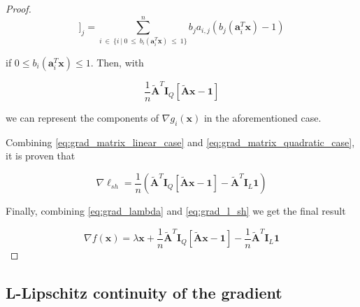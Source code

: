 \documentclass[12pt]{article}
\newcommand{\xb}{\mathbf{x}}
\newcommand{\ab}{\mathbf{a}}
\newcommand{\abi}{\ab_i}
\newcommand{\ellsh}{\ell_{sh}}
\newcommand{\ax}{\abi^T\xb}
\newcommand{\atilde}{\mathbf{\tilde{A}}}
\newcommand{\id}{\mathbf{I}}
\newcommand{\ones}{\mathbf{1}}
\begin{document}
\begin{proof}
\begin{equation*}
    [\atilde^T\id_Q[\atilde \xb - \ones]]_j =
    \sum_{i \ \in \ \{i \ | \ 0 \ \leq \ b_i(\ax) \ \leq \ 1\}}^{n} b_j a_{i, j} (b_j(\ax) - 1)
\end{equation*}

if $0 \leq b_i(\ax) \leq 1$. Then, with 

\begin{equation} \label{eq:grad_matrix_quadratic_case}
    \frac{1}{n}\atilde^T\id_Q[\atilde \xb - \ones]
\end{equation}

we can represent the components of $\nabla g_i(\xb)$ in the aforementioned case.

Combining \eqref{eq:grad_matrix_linear_case} and \eqref{eq:grad_matrix_quadratic_case}, it is proven that

\begin{equation} \label{eq:grad_l_sh}
    \nabla \ellsh = \frac{1}{n}(\atilde^T\id_Q[\atilde \xb - \ones] - \atilde^T\id_L\ones)
\end{equation}

Finally, combining \eqref{eq:grad_lambda} and \eqref{eq:grad_l_sh} we get the final result

\begin{equation}
    \nabla f(\xb) = \lambda\xb + \frac{1}{n}\atilde^T\id_Q[\atilde \xb - \ones] - \frac{1}{n}\atilde^T\id_L\ones
\end{equation}

\end{proof}

\subsection*{L-Lipschitz continuity of the gradient}
\end{document}
